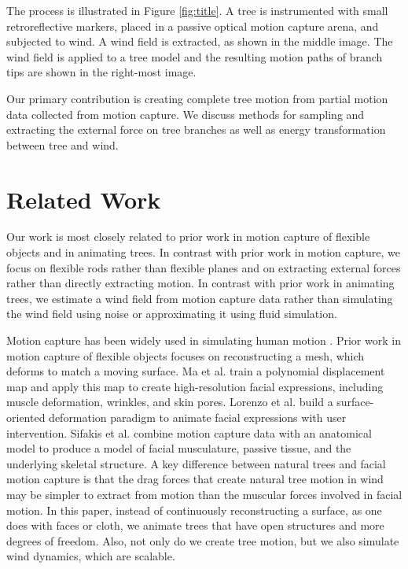 The process is illustrated in Figure \ref{fig:title}. A tree is instrumented with small retroreflective markers, placed in a passive optical motion capture arena, and subjected to wind. A wind field is extracted, as shown in the middle image. The wind field is applied to a tree model and the resulting motion paths of branch tips are shown in the right-most image.

Our primary contribution is creating complete tree motion from partial motion data collected from motion capture. We discuss methods for sampling and extracting the external force on tree branches as well as energy transformation between tree and wind.

\section{Related Work}

Our work is most closely related to prior work in motion capture of flexible objects and in animating trees. In contrast with prior work in motion capture, we focus on flexible rods rather than flexible planes and on extracting external forces rather than directly extracting motion. In contrast with prior work in animating trees, we estimate a wind field from motion capture data rather than simulating the wind field using noise or approximating it using fluid simulation. 

Motion capture has been widely used in simulating human motion \cite{Kwatra:TVCG200966,Lou:EHM2010,Rajko:2007:RAK,Wen:2006:MCD}. Prior work in motion capture of flexible objects focuses on reconstructing a mesh, which deforms to match a moving surface. Ma et al. \cite{Ma:FPS2008} train a polynomial displacement map and apply this map to create high-resolution facial expressions, including muscle deformation, wrinkles, and skin pores. Lorenzo et al. \cite{Lorenzo03} build a surface-oriented deformation paradigm to animate facial expressions with user intervention. Sifakis et al. \cite{SifakisEftychios2005} combine motion capture data with an anatomical model to produce a model of facial musculature, passive tissue, and the underlying skeletal structure. A key difference between natural trees and facial motion capture is that the drag forces that create natural tree motion in wind may be simpler to extract from motion than the muscular forces involved in facial motion. In this paper, instead of continuously reconstructing a surface, as one does with faces or cloth, we animate trees that have open structures and more degrees of freedom. Also, not only do we create tree motion, but we also simulate wind dynamics, which are scalable.

